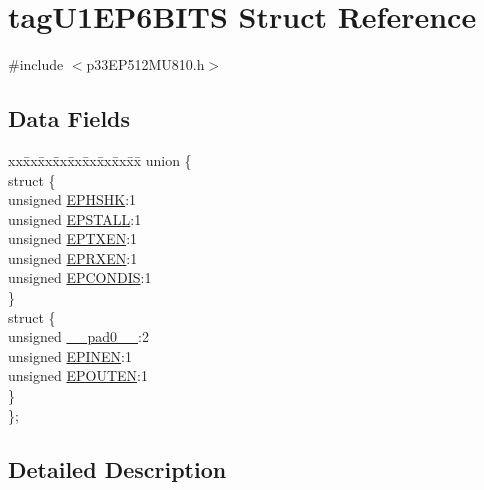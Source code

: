 \hypertarget{structtag_u1_e_p6_b_i_t_s}{}\section{tag\+U1\+E\+P6\+B\+I\+TS Struct Reference}
\label{structtag_u1_e_p6_b_i_t_s}


{\ttfamily \#include $<$p33\+E\+P512\+M\+U810.\+h$>$}

\subsection*{Data Fields}
\begin{DoxyCompactItemize}
\item 
\begin{tabbing}
xx\=xx\=xx\=xx\=xx\=xx\=xx\=xx\=xx\=\kill
union \{\\
\>struct \{\\
\>\>unsigned \hyperlink{structtag_u1_e_p6_b_i_t_s_a0d06430217cb4b189fbe9d0c4b460482}{EPHSHK}:1\\
\>\>unsigned \hyperlink{structtag_u1_e_p6_b_i_t_s_a47042104f04ebe06a23f9789bd400d7e}{EPSTALL}:1\\
\>\>unsigned \hyperlink{structtag_u1_e_p6_b_i_t_s_aa2d88c1be513e759c136823c86a355b4}{EPTXEN}:1\\
\>\>unsigned \hyperlink{structtag_u1_e_p6_b_i_t_s_a8a388d32ceffb87230e660b6793f2857}{EPRXEN}:1\\
\>\>unsigned \hyperlink{structtag_u1_e_p6_b_i_t_s_a1bd26df05d2b5a11b20ee548fce90c3e}{EPCONDIS}:1\\
\>\} \\
\>struct \{\\
\>\>unsigned \hyperlink{structtag_u1_e_p6_b_i_t_s_adf71f3d8410c1f1dbbc96680a92c49af}{\_\_pad0\_\_}:2\\
\>\>unsigned \hyperlink{structtag_u1_e_p6_b_i_t_s_a8b6d98cdf233ac90ff19d16d9a89215e}{EPINEN}:1\\
\>\>unsigned \hyperlink{structtag_u1_e_p6_b_i_t_s_adf87e8acfbb27a5626e21b3e3bd106fd}{EPOUTEN}:1\\
\>\} \\
\}; \\

\end{tabbing}\end{DoxyCompactItemize}


\subsection{Detailed Description}


